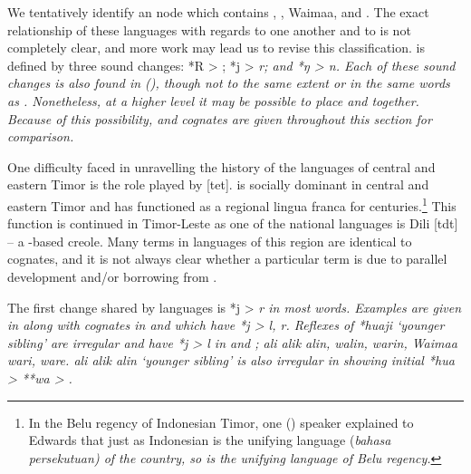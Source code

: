 \largerpage
{}
We tentatively identify an  node which contains
, , Waima{\Q}a, and .
The exact relationship of these languages with regards to one
another and to  is not completely clear,
and more work may lead us to revise this classification.
 is defined by three sound changes: *R > {\0};
*j > \it{r}; and *ŋ > \it{n}.
Each of these sound changes is also found in 
(), though not to the same extent or in the same words as .
Nonetheless, at a higher level it may be possible to place  and  together.
Because of this possibility,
 and  cognates are given throughout this section for comparison.

\largerpage
One difficulty faced in unravelling the history of the languages
of central and eastern Timor is the role played by  [tet].
 is socially dominant in central
and eastern Timor and has functioned as a regional lingua franca
for centuries.\footnote{
		In the Belu regency of Indonesian Timor,
		one  () speaker explained to Edwards that just
		as Indonesian is the unifying language (\it{bahasa persekutuan})
		of the country, so  is the unifying language of Belu regency.}
This function
is continued in Timor-Leste as one of the national languages
is  Dili [tdt] -- a -based creole.
Many terms in languages of this region are identical to 
cognates, and it is not always clear whether a particular term is due to
parallel development and/or borrowing from .

The first change shared by  languages is *j
> \it{r} in most words.
Examples are given in  along with cognates in 
and  which have *j > \it{l}, \it{r}.
Reflexes of *huaji ‘younger sibling’ are irregular
and have *j > \it{l} in 
and ;  \it{ali {\tl} alik {\tl} alin},
 \it{walin},  \it{warin},
Waima{\Q}a \it{wari},  \it{ware}.
 \it{ali {\tl} alik {\tl} alin} ‘younger sibling’ is also
irregular in showing initial *hua > **wa > {\0}.

